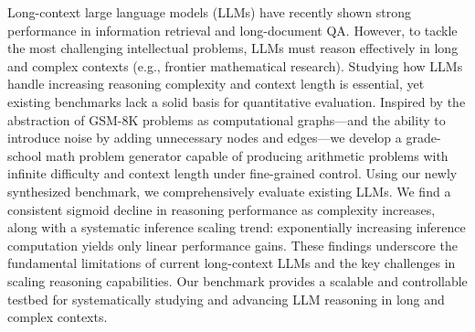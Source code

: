 Long-context large language models (LLMs) have recently shown strong performance in information retrieval and long-document QA. However, to tackle the most challenging intellectual problems, LLMs must reason effectively in long and complex contexts (e.g., frontier mathematical research). Studying how LLMs handle increasing reasoning complexity and context length is essential, yet existing benchmarks lack a solid basis for quantitative evaluation. Inspired by the abstraction of GSM-8K problems as computational graphs—and the ability to introduce noise by adding unnecessary nodes and edges—we develop a grade-school math problem generator capable of producing arithmetic problems with infinite difficulty and context length under fine-grained control. Using our newly synthesized \sysb benchmark, we comprehensively evaluate existing LLMs. We find a consistent sigmoid decline in reasoning performance as complexity increases, along with a systematic inference scaling trend: exponentially increasing inference computation yields only linear performance gains. These findings underscore the fundamental limitations of current long-context LLMs and the key challenges in scaling reasoning capabilities. Our \sysb benchmark provides a scalable and controllable testbed for systematically studying and advancing LLM reasoning in long and complex contexts.
